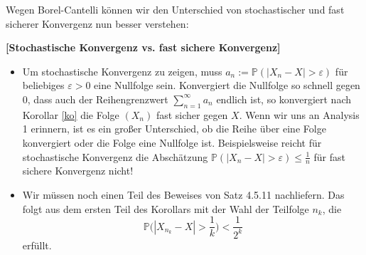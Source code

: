 Wegen Borel-Cantelli k\"onnen wir den Unterschied von stochastischer und fast sicherer Konvergenz nun besser verstehen:
\begin{bem}\label{bem4}
 \textbf{[Stochastische Konvergenz vs. fast sichere Konvergenz]}
\begin{itemize}
\item	Um stochastische Konvergenz zu zeigen, muss $a_n:=\mathbb P(|X_n-X|>\varepsilon)$ f\"ur beliebiges $\varepsilon>0$  eine Nullfolge sein. Konvergiert die Nullfolge so schnell gegen $0$, dass auch der Reihengrenzwert $\sum_{n=1}^\infty a_n$ endlich ist, so konvergiert nach Korollar \ref{ko} die Folge $(X_n)$ fast sicher gegen $X$. Wenn wir uns an Analysis 1 erinnern, ist es ein gro\ss er Unterschied, ob die Reihe \"uber eine Folge konvergiert oder die Folge eine Nullfolge ist. Beispielsweise reicht f\"ur stochastische Konvergenz die Absch\"atzung $\mathbb P(|X_n-X|>\varepsilon)\leq \frac{1}{n}$ f\"ur fast sichere Konvergenz nicht!
	\item Wir m\"ussen noch einen Teil des Beweises von Satz 4.5.11 nachliefern. Das folgt aus dem ersten Teil des Korollars mit der Wahl der Teilfolge $n_k$, die $$\mathbb P\Big(|X_{n_k}-X|>\frac 1 k\Big)<\frac{1}{2^k}$$ erf\"ullt.
\end{itemize}
\end{bem}




